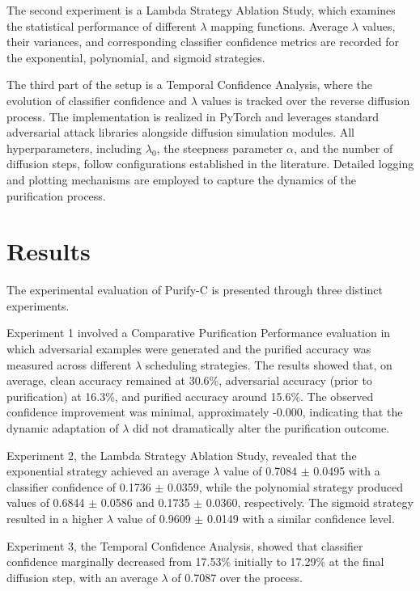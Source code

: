 \documentclass{article} %
\begin{document}
The second experiment is a Lambda Strategy Ablation Study, which examines the statistical performance of different $\lambda$ mapping functions. Average $\lambda$ values, their variances, and corresponding classifier confidence metrics are recorded for the exponential, polynomial, and sigmoid strategies.

The third part of the setup is a Temporal Confidence Analysis, where the evolution of classifier confidence and $\lambda$ values is tracked over the reverse diffusion process. The implementation is realized in PyTorch\citep{Thuerey2019} and leverages standard adversarial attack libraries alongside diffusion simulation modules. All hyperparameters, including \(\lambda_0\), the steepness parameter \(\alpha\), and the number of diffusion steps, follow configurations established in the literature. Detailed logging and plotting mechanisms are employed to capture the dynamics of the purification process.

\section{Results}
\label{sec:results}
The experimental evaluation of Purify-C is presented through three distinct experiments.

Experiment 1 involved a Comparative Purification Performance evaluation in which adversarial examples were generated and the purified accuracy was measured across different $\lambda$ scheduling strategies. The results showed that, on average, clean accuracy remained at 30.6\%, adversarial accuracy (prior to purification) at 16.3\%, and purified accuracy around 15.6\%. The observed confidence improvement was minimal, approximately -0.000, indicating that the dynamic adaptation of $\lambda$ did not dramatically alter the purification outcome.

Experiment 2, the Lambda Strategy Ablation Study, revealed that the exponential strategy achieved an average $\lambda$ value of 0.7084 $\pm$ 0.0495 with a classifier confidence of 0.1736 $\pm$ 0.0359, while the polynomial strategy produced values of 0.6844 $\pm$ 0.0586 and 0.1735 $\pm$ 0.0360, respectively. The sigmoid strategy resulted in a higher $\lambda$ value of 0.9609 $\pm$ 0.0149 with a similar confidence level.

Experiment 3, the Temporal Confidence Analysis, showed that classifier confidence marginally decreased from 17.53\% initially to 17.29\% at the final diffusion step, with an average $\lambda$ of 0.7087 over the process.
\end{document}
